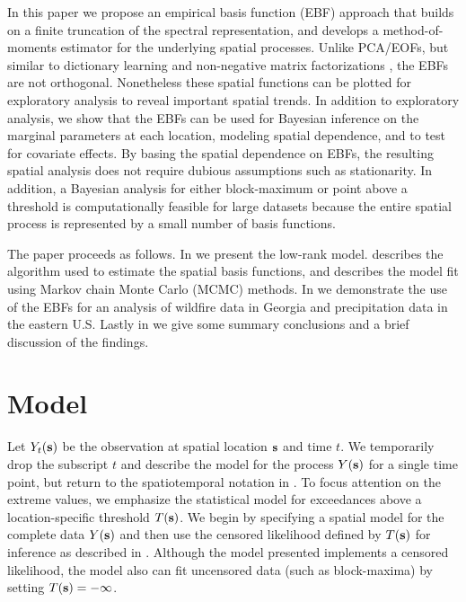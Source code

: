 In this paper we propose an empirical basis function (EBF) approach that builds on a finite truncation of the spectral representation, and develops a method-of-moments estimator for the underlying spatial processes.
Unlike PCA/EOFs, but similar to dictionary learning \citep{Mairal2014} and non-negative matrix factorizations \citep{Lee1999}, the EBFs are not orthogonal.
Nonetheless these spatial functions can be plotted for exploratory analysis to reveal important spatial trends.
In addition to exploratory analysis, we show that the EBFs can be used for Bayesian inference on the marginal parameters at each location, modeling spatial dependence, and to test for covariate effects.
By basing the spatial dependence on EBFs, the resulting spatial analysis does not require dubious assumptions such as stationarity.
In addition, a Bayesian analysis for either block-maximum or point above a threshold is computationally feasible for large datasets because the entire spatial process is represented by a small number of basis functions.

The paper proceeds as follows. In  we present the low-rank model.  describes the algorithm used to estimate the spatial basis functions, and  describes the model fit using Markov chain Monte Carlo (MCMC) methods. In  we demonstrate the use of the EBFs for an analysis of wildfire data in Georgia and precipitation data in the eastern U.S. Lastly in  we give some summary conclusions and a brief discussion of the findings.

\section{Model}\label{ebs:model}

Let $Y_{t}(\mathbf{s})$ be the observation at spatial location $\mathbf{s}$ and time $t$.  We temporarily drop the subscript $t$ and describe the model for the process $Y(\mathbf{s})$ for a single time point, but return to the spatiotemporal notation in .
To focus attention on the extreme values, we emphasize the statistical model for exceedances above a location-specific threshold $T(\mathbf{s})$.
We begin by specifying a spatial model for the complete data $Y(\mathbf{s})$ and then use the censored likelihood defined by $T(\mathbf{s})$ for inference as described in .
Although the model presented implements a censored likelihood, the model also can fit uncensored data (such as block-maxima) by setting $T(\mathbf{s}) = -\infty$.

